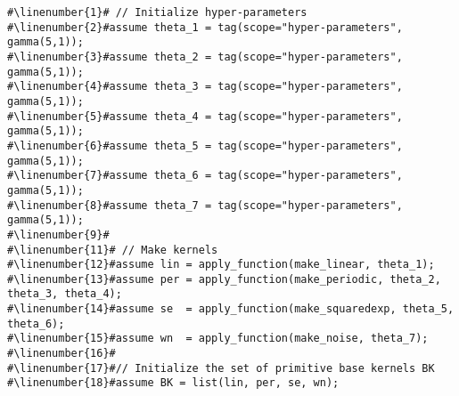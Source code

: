 \begin{mdframed}
\begin{minipage}{\linewidth}
\small
\belowcaptionskip=-10pt
\begin{lstlisting}[mathescape,label=alg:base_kernels,basicstyle=\selectfont\ttfamily,numbers=none,caption={Initialize
Base Kernels BK and $P(n)$},escapechar=\#]
#\linenumber{1}# // Initialize hyper-parameters
#\linenumber{2}#assume theta_1 = tag(scope="hyper-parameters", gamma(5,1));
#\linenumber{3}#assume theta_2 = tag(scope="hyper-parameters", gamma(5,1));
#\linenumber{4}#assume theta_3 = tag(scope="hyper-parameters", gamma(5,1));
#\linenumber{5}#assume theta_4 = tag(scope="hyper-parameters", gamma(5,1));
#\linenumber{6}#assume theta_5 = tag(scope="hyper-parameters", gamma(5,1));
#\linenumber{7}#assume theta_6 = tag(scope="hyper-parameters", gamma(5,1));
#\linenumber{8}#assume theta_7 = tag(scope="hyper-parameters", gamma(5,1));
#\linenumber{9}#
#\linenumber{11}# // Make kernels
#\linenumber{12}#assume lin = apply_function(make_linear, theta_1);
#\linenumber{13}#assume per = apply_function(make_periodic, theta_2, theta_3, theta_4);
#\linenumber{14}#assume se  = apply_function(make_squaredexp, theta_5, theta_6);
#\linenumber{15}#assume wn  = apply_function(make_noise, theta_7);
#\linenumber{16}#
#\linenumber{17}#// Initialize the set of primitive base kernels BK 
#\linenumber{18}#assume BK = list(lin, per, se, wn);
\end{lstlisting}
\end{minipage}
\end{mdframed}

